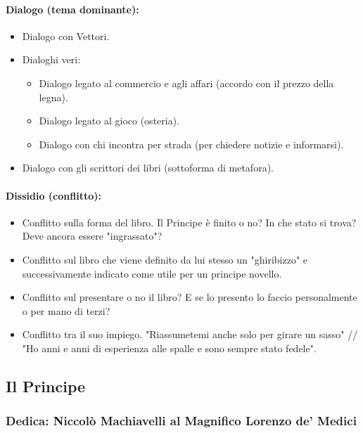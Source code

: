 \documentclass{article}
\begin{document}
\paragraph{Dialogo (tema dominante):}
\begin{itemize}
    \item Dialogo con Vettori.
    \item Dialoghi veri:
    \begin{itemize}
        \item Dialogo legato al commercio e agli affari (accordo con il prezzo della legna).
        \item Dialogo legato al gioco (osteria).
        \item Dialogo con chi incontra per strada (per chiedere notizie e informarsi).
    \end{itemize}
    \item Dialogo con gli scrittori dei libri (sottoforma di metafora).
\end{itemize}

\paragraph{Dissidio (conflitto):}
\begin{itemize}
    \item Conflitto sulla forma del libro. Il Principe è finito o no? In che stato si trova? Deve ancora essere "ingrassato"?
    \item Conflitto sul libro che viene definito da lui stesso un "ghiribizzo" e successivamente indicato come utile per un principe novello.
    \item Conflitto sul presentare o no il libro? E se lo presento lo faccio personalmente o per mano di terzi?
    \item Conflitto tra il suo impiego. "Riassumetemi anche solo per girare un sasso" // "Ho anni e anni di esperienza alle spalle e sono sempre stato fedele".
\end{itemize}

\newpage
\subsection{Il Principe}
\subsubsection{Dedica: Niccolò Machiavelli al Magnifico Lorenzo de' Medici}
\end{document}
